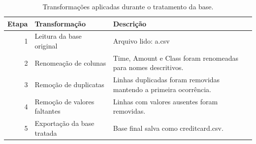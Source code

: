 \begin{table}
\caption{Transformações aplicadas durante o tratamento da base.}
\label{tab:transformacoes-base}
\begin{tabular}{rll}
\toprule
Etapa & Transformação & Descrição \\
\midrule
1 & Leitura da base original & Arquivo lido: a.csv \\
2 & Renomeação de colunas & Time, Amount e Class foram renomeadas para nomes descritivos. \\
3 & Remoção de duplicatas & Linhas duplicadas foram removidas mantendo a primeira ocorrência. \\
4 & Remoção de valores faltantes & Linhas com valores ausentes foram removidas. \\
5 & Exportação da base tratada & Base final salva como creditcard.csv. \\
\bottomrule
\end{tabular}
\end{table}
